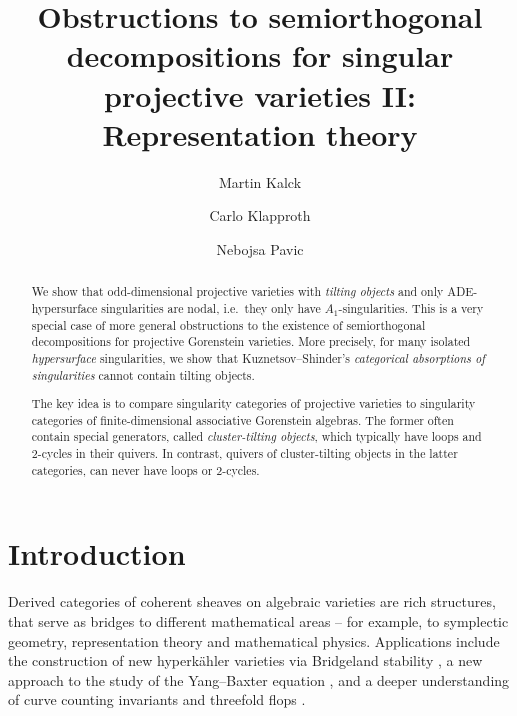 \documentclass[reqno, 12pt, a4paper, twosided, english]{amsart}
\title[Obstructions to semiorthogonal decompositions II]{Obstructions to semiorthogonal decompositions for singular projective varieties II: Representation theory}
\author{Martin Kalck}
\author{Carlo Klapproth}
\author{Nebojsa Pavic}
\theoremstyle{plain}
\theoremstyle{definition}
\theoremstyle{remark}
\newtheorem*{Key Statement}{Key Statement}
\begin{document}



\begin{abstract}
    We show that odd-dimensional projective varieties with \emph{tilting objects} and only ADE-hypersurface singularities are nodal, i.e.\ they only have $A_1$-singularities. This is a very special case of more general obstructions to the existence of semiorthogonal decompositions for projective Gorenstein varieties. More precisely, for many isolated \emph{hypersurface} singularities, we show that 
    Kuznetsov--Shinder's \emph{categorical absorptions of singularities} cannot contain tilting objects.

    The key idea is to compare singularity categories of projective varieties to singularity categories of finite-dimensional associative Gorenstein algebras. The former often contain special generators, called \emph{cluster-tilting objects}, which typically have loops and $2$-cycles in their quivers. In contrast, quivers of cluster-tilting objects in the latter categories, can never have loops or $2$-cycles.
\end{abstract}


\maketitle
\tableofcontents

%
\section{Introduction}
Derived categories of coherent sheaves on algebraic varieties are rich structures, that serve as bridges to different mathematical areas -- for example, to symplectic geometry, representation theory and mathematical physics. Applications include the construction of new hyperkähler varieties via Bridgeland stability \cite{BL+}, a new approach to the study of the Yang--Baxter equation \cite{Polishchuk, BurbanKreussler},   
and a deeper understanding of curve counting invariants \cite{BrownWemyss} and threefold flops \cite{WemyssFlops}.
\end{document}
